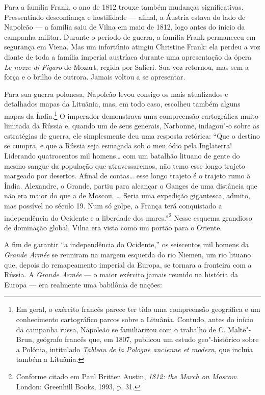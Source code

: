 Para a família Frank, o ano de 1812 trouxe também mudanças
significativas. Pressentindo desconfiança e hostilidade --- afinal, a
Áustria estava do lado de Napoleão --- a família saiu de Vilna em maio de
1812, logo antes do início da campanha militar. Durante o período de
guerra, a família Frank permaneceu em segurança em Viena. Mas um
infortúnio atingiu Christine Frank: ela perdeu a voz diante de toda a
família imperial austríaca durante uma apresentação da ópera \emph{Le
nozze di Figaro} de Mozart, regida por Salieri. Sua voz retornou, mas
sem a força e o brilho de outrora. Jamais voltou a se apresentar.

\asterisc

Para sua guerra polonesa, Napoleão levou consigo os mais atualizados e
detalhados mapas da Lituânia, mas, em todo caso, escolheu também alguns
mapas da Índia.\footnote{Em geral, o exército francês parece ter tido
  uma compreensão geográfica e um conhecimento cartográfico parcos sobre
  a Lituânia. Contudo, antes do início da campanha russa, Napoleão se
  familiarizou com o trabalho de C. Malte"-Brun, geógrafo francês que, em
  1807, publicou um estudo geo"-histórico sobre a Polônia, intitulado
  \emph{Tableau de la Pologne ancienne et modern}, que incluía também a
  Lituânia.} O imperador demonstrava uma compreensão cartográfica muito
limitada da Rússia e, quando um de seus generais, Narbonne, indagou"-o
sobre as estratégias de guerra, ele simplesmente deu uma resposta
retórica: ``Que o destino se cumpra, e que a Rússia seja esmagada sob o
meu ódio pela Inglaterra! Liderando quatrocentos mil homens\ldots{} com
um batalhão lituano de gente do mesmo sangue da população que
atravessaremos, não temo esse longo trajeto margeado por desertos.
Afinal de contas\ldots{} esse longo trajeto é o trajeto rumo à Índia.
Alexandre, o Grande, partiu para alcançar o Ganges de uma distância que
não era maior do que a de Moscou. \ldots{} Seria uma expedição
gigantesca, admito, mas possível no século 19. Num só golpe, a França
terá conquistado a independência do Ocidente e a liberdade dos
mares.''\footnote{Conforme citado em Paul Britten Austin, \emph{1812:
  the March on Moscow}. London: Greenhill Books, 1993, p. 31.} Nesse
esquema grandioso de dominação global, Vilna era vista como um portão
para o Oriente.

A fim de garantir ``a independência do Ocidente,'' os seiscentos mil
homens da \emph{Grande Armée} se reuniram na margem esquerda do rio
Niemen, um rio lituano que, depois do remapeamento imperial da Europa,
se tornara a fronteira com a Rússia. A \emph{Grande Armée} --- o maior
exército jamais reunido na história da Europa --- era realmente uma
babilônia de nações:

